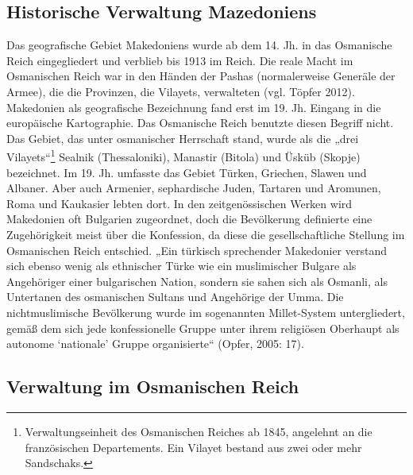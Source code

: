 \subsection{Historische Verwaltung Mazedoniens}
Das geografische Gebiet Makedoniens wurde ab dem 14. Jh. in das Osmanische Reich eingegliedert und verblieb bis 1913 im Reich. Die reale Macht im Osmanischen Reich war in den Händen der Pashas (normalerweise Generäle der Armee), die die Provinzen, die Vilayets, verwalteten (vgl. Töpfer 2012). Makedonien als geografische Bezeichnung fand erst im 19. Jh. Eingang in die europäische Kartographie. Das Osmanische Reich benutzte diesen Begriff nicht. Das Gebiet, das unter osmanischer Herrschaft stand, wurde als die „drei Vilayets“\footnote{Verwaltungseinheit des Osmanischen Reiches ab 1845, angelehnt an die französischen Departements. Ein Vilayet bestand aus zwei oder mehr Sandschaks.} Sealnik (Thessaloniki), Manastir (Bitola) und Üsküb (Skopje) bezeichnet. Im 19. Jh. umfasste das Gebiet Türken, Griechen, Slawen und Albaner. Aber auch Armenier, sephardische Juden, Tartaren und Aromunen, Roma und Kaukasier lebten dort. In den zeitgenössischen Werken wird Makedonien oft Bulgarien zugeordnet, doch die Bevölkerung definierte eine Zugehörigkeit meist über die Konfession, da diese die gesellschaftliche Stellung im Osmanischen Reich entschied. „Ein türkisch sprechender Makedonier verstand sich ebenso wenig als ethnischer Türke wie ein muslimischer Bulgare als Angehöriger einer bulgarischen Nation, sondern sie sahen sich als Osmanli, als Untertanen des osmanischen Sultans und Angehörige der Umma. Die nichtmuslimische Bevölkerung wurde im sogenannten Millet-System untergliedert, gemäß dem sich jede konfessionelle Gruppe unter ihrem religiösen Oberhaupt als autonome ‘nationale’ Gruppe organisierte“ (Opfer, 2005: 17).

\subsection{Verwaltung im Osmanischen Reich}

